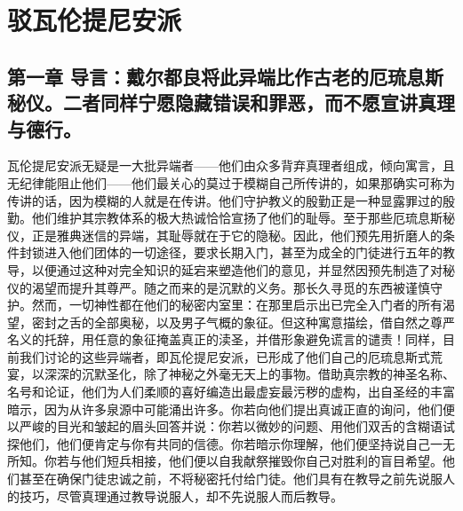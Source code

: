 
\chapter{驳瓦伦提尼安派}



\section{第一章 导言：戴尔都良将此异端比作古老的厄琉息斯秘仪。二者同样宁愿隐藏错误和罪恶，而不愿宣讲真理与德行。}

瓦伦提尼安派无疑是一大批异端者——他们由众多背弃真理者组成，倾向寓言，且无纪律能阻止他们——他们最关心的莫过于模糊自己所传讲的，如果那确实可称为传讲的话，因为模糊的人就是在传讲。他们守护教义的殷勤正是一种显露罪过的殷勤。他们维护其宗教体系的极大热诚恰恰宣扬了他们的耻辱。至于那些厄琉息斯秘仪，正是雅典迷信的异端，其耻辱就在于它的隐秘。因此，他们预先用折磨人的条件封锁进入他们团体的一切途径，要求长期入门，甚至为成全的门徒进行五年的教导，以便通过这种对完全知识的延宕来塑造他们的意见，并显然因预先制造了对秘仪的渴望而提升其尊严。随之而来的是沉默的义务。那长久寻觅的东西被谨慎守护。然而，一切神性都在他们的秘密内室里：在那里启示出已完全入门者的所有渴望，密封之舌的全部奥秘，以及男子气概的象征。但这种寓意描绘，借自然之尊严名义的托辞，用任意的象征掩盖真正的渎圣，并借形象避免谎言的谴责！同样，目前我们讨论的这些异端者，即瓦伦提尼安派，已形成了他们自己的厄琉息斯式荒宴，以深深的沉默圣化，除了神秘之外毫无天上的事物。借助真宗教的神圣名称、名号和论证，他们为人们柔顺的喜好编造出最虚妄最污秽的虚构，出自圣经的丰富暗示，因为从许多泉源中可能涌出许多。你若向他们提出真诚正直的询问，他们便以严峻的目光和皱起的眉头回答并说：你若以微妙的问题、用他们双舌的含糊语试探他们，他们便肯定与你有共同的信德。你若暗示你理解，他们便坚持说自己一无所知。你若与他们短兵相接，他们便以自我献祭摧毁你自己对胜利的盲目希望。他们甚至在确保门徒忠诚之前，不将秘密托付给门徒。他们具有在教导之前先说服人的技巧，尽管真理通过教导说服人，却不先说服人而后教导。\par


